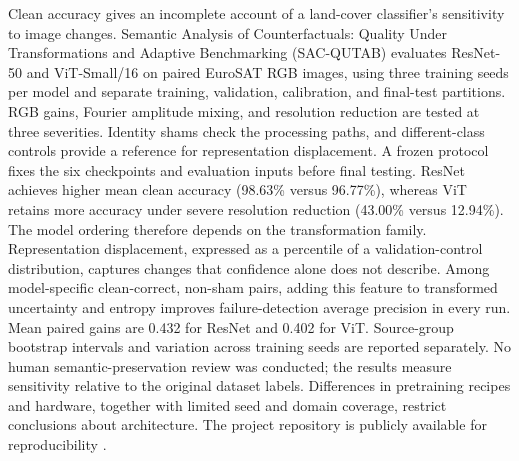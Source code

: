 Clean accuracy gives an incomplete account of a land-cover classifier's sensitivity to image changes. Semantic Analysis of Counterfactuals: Quality Under Transformations and Adaptive Benchmarking (SAC-QUTAB) evaluates ResNet-50 and ViT-Small/16 on paired EuroSAT RGB images, using three training seeds per model and separate training, validation, calibration, and final-test partitions. RGB gains, Fourier amplitude mixing, and resolution reduction are tested at three severities. Identity shams check the processing paths, and different-class controls provide a reference for representation displacement. A frozen protocol fixes the six checkpoints and evaluation inputs before final testing. ResNet achieves higher mean clean accuracy (98.63\% versus 96.77\%), whereas ViT retains more accuracy under severe resolution reduction (43.00\% versus 12.94\%). The model ordering therefore depends on the transformation family. Representation displacement, expressed as a percentile of a validation-control distribution, captures changes that confidence alone does not describe. Among model-specific clean-correct, non-sham pairs, adding this feature to transformed uncertainty and entropy improves failure-detection average precision in every run. Mean paired gains are 0.432 for ResNet and 0.402 for ViT. Source-group bootstrap intervals and variation across training seeds are reported separately. No human semantic-preservation review was conducted; the results measure sensitivity relative to the original dataset labels. Differences in pretraining recipes and hardware, together with limited seed and domain coverage, restrict conclusions about architecture. The project repository is publicly available for reproducibility \cite{repository}.

